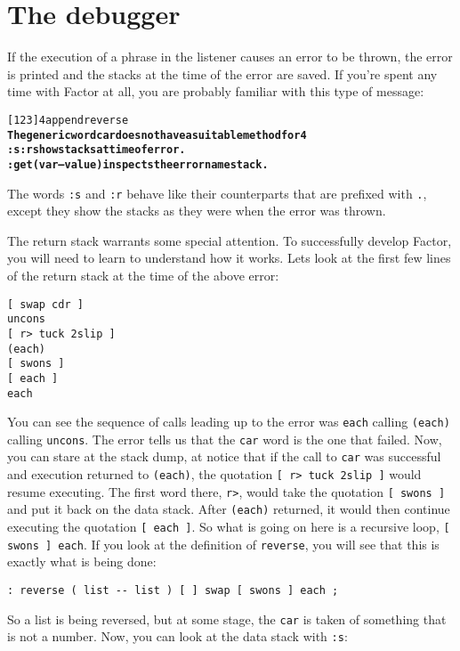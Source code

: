 \documentclass{book}
\begin{document}
\section{The debugger}

If the execution of a phrase in the listener causes an error to be thrown, the error
is printed and the stacks at the time of the error are saved. If you're spent any
time with Factor at all, you are probably familiar with this type of message:

\begin{alltt}
  [ 1 2 3 ] 4 append reverse
\textbf{The generic word car does not have a suitable method for 4
:s :r show stacks at time of error.
:get ( var -- value ) inspects the error namestack.}
\end{alltt}

The words \texttt{:s} and \texttt{:r} behave like their counterparts that are prefixed with \texttt{.}, except they show the stacks as they were when the error was thrown.

The return stack warrants some special attention. To successfully develop Factor, you will need to learn to understand how it works. Lets look at the first few lines of the return stack at the time of the above error:

\begin{verbatim}
[ swap cdr ]
uncons
[ r> tuck 2slip ]
(each)
[ swons ]
[ each ]
each
\end{verbatim}

You can see the sequence of calls leading up to the error was \texttt{each} calling \texttt{(each)} calling \texttt{uncons}. The error tells us that the \texttt{car} word is the one that failed. Now, you can stare at the stack dump, at notice that if the call to \texttt{car} was successful and execution returned to \texttt{(each)}, the quotation \texttt{[ r> tuck 2slip ]} would resume executing. The first word there, \texttt{r>}, would take the quotation \texttt{[ swons ]} and put it back on the data stack. After \texttt{(each)} returned, it would then continue executing the quotation \texttt{[ each ]}. So what is going on here is a recursive loop, \texttt{[ swons ] each}. If you look at the definition of \texttt{reverse}, you will see that this is exactly what is being done:

\begin{verbatim}
: reverse ( list -- list ) [ ] swap [ swons ] each ;
\end{verbatim}

So a list is being reversed, but at some stage, the \texttt{car} is taken of something that is not a number. Now, you can look at the data stack with \texttt{:s}:
\end{document}
